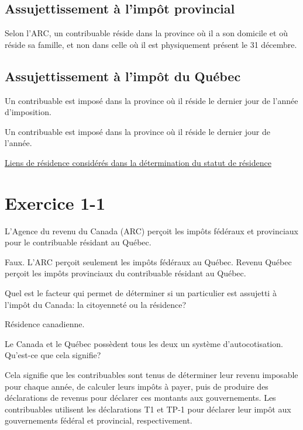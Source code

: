 \subsection{Assujettissement à l'impôt provincial}
\begin{note}
	Selon l'ARC, un contribuable réside dans la province où il a son domicile et où réside sa famille, et non dans celle où il est physiquement présent le 31 décembre.
\end{note}


\subsection{Assujettissement à l'impôt du Québec}
\begin{note}
	Un contribuable est imposé dans la province où il réside le dernier jour de l'année d'imposition.
\end{note}
Un contribuable est imposé dans la province où il réside le dernier jour de l'année.

\href{https://www.revenuquebec.ca/fr/citoyens/votre-situation/statut-de-residence-et-assujettissement-a-limpot/liens-de-residence-consideres-dans-la-determination-du-statut-de-residence/}{Liens de résidence considérés dans la détermination du statut de résidence}



\section{Exercice 1-1}
\setcounter{question}{0}
\begin{question}
	L'Agence du revenu du Canada (ARC) perçoit les impôts fédéraux et provinciaux pour le contribuable résidant au Québec.
\end{question}
Faux. L'ARC perçoit seulement les impôts fédéraux au Québec. Revenu Québec perçoit les impôts provinciaux du contribuable résidant au Québec.

\begin{question}
	Quel est le facteur qui permet de déterminer si un particulier est assujetti à l'impôt du Canada: la citoyenneté ou la résidence?
\end{question}
Résidence canadienne.

\begin{question}
	Le Canada et le Québec possèdent tous les deux un système d'autocotisation. Qu'est-ce que cela signifie?
\end{question}
Cela signifie que les contribuables sont tenus de déterminer leur revenu imposable pour chaque année, de calculer leurs impôts à payer, puis de produire des déclarations de revenus pour déclarer ces montants aux gouvernements. Les contribuables utilisent les déclarations T1 et TP-1 pour déclarer leur impôt aux gouvernements fédéral et provincial, respectivement.

